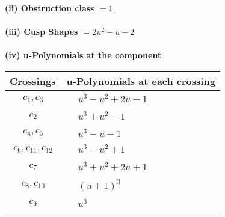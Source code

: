 \documentclass[1p]{elsarticle_modified}
\theoremstyle{definition}
\begin{document}
\flushleft \textbf{(ii) Obstruction class $= 1$}\\~\\
\flushleft \textbf{(iii) Cusp Shapes $= 2 u^2- u-2$}\\~\\
\newpage\renewcommand{\arraystretch}{1}
\flushleft \textbf{(iv) u-Polynomials at the component}\newline \\
\begin{tabular}{m{50pt}|m{274pt}}
Crossings & \hspace{64pt}u-Polynomials at each crossing \\
\hline $$\begin{aligned}c_{1},c_{3}\end{aligned}$$&$\begin{aligned}
&u^3- u^2+2 u-1
\end{aligned}$\\
\hline $$\begin{aligned}c_{2}\end{aligned}$$&$\begin{aligned}
&u^3+u^2-1
\end{aligned}$\\
\hline $$\begin{aligned}c_{4},c_{5}\end{aligned}$$&$\begin{aligned}
&u^3- u-1
\end{aligned}$\\
\hline $$\begin{aligned}c_{6},c_{11},c_{12}\end{aligned}$$&$\begin{aligned}
&u^3- u^2+1
\end{aligned}$\\
\hline $$\begin{aligned}c_{7}\end{aligned}$$&$\begin{aligned}
&u^3+u^2+2 u+1
\end{aligned}$\\
\hline $$\begin{aligned}c_{8},c_{10}\end{aligned}$$&$\begin{aligned}
&(u+1)^3
\end{aligned}$\\
\hline $$\begin{aligned}c_{9}\end{aligned}$$&$\begin{aligned}
&u^3
\end{aligned}$\\
\hline
\end{tabular}\\~\\
\end{document}
